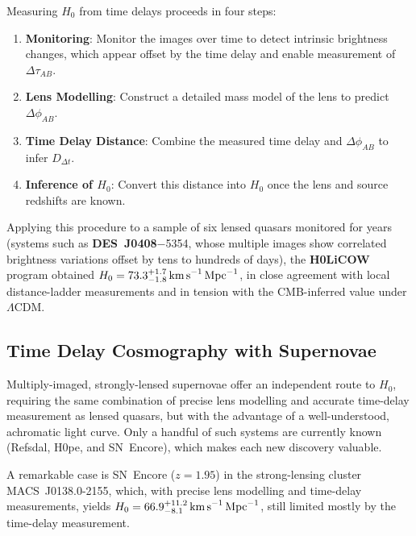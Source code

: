 \medskip

Measuring $H_0$ from time delays proceeds in four steps:
\begin{enumerate}
    \item \textbf{Monitoring}: Monitor the images over time to detect intrinsic brightness changes, which appear offset by the time delay and enable measurement of $\Delta\tau_{AB}$.
    \item \textbf{Lens Modelling}: Construct a detailed mass model of the lens to predict $\Delta\phi_{AB}$.
    \item \textbf{Time Delay Distance}: Combine the measured time delay and $\Delta\phi_{AB}$ to infer  $D_{\Delta t}$.
    \item \textbf{Inference of $H_0$}: Convert this distance into $H_0$ once the lens and source redshifts are known.
\end{enumerate}

\begin{observationblock}
Applying this procedure to a sample of six lensed quasars monitored for years (systems such as \textbf{DES~J0408}$-$5354, whose multiple images show correlated brightness variations offset by tens to hundreds of days), the \textbf{H0LiCOW} program obtained $H_0 = 73.3^{+1.7}_{-1.8}\,\text{km\,s}^{-1}\,\text{Mpc}^{-1}$, in close agreement with local distance-ladder measurements and in tension with the CMB-inferred value under $\Lambda$CDM.
\end{observationblock}

\subsection{Time Delay Cosmography with Supernovae} \label{subsec:sn_time_delay}

Multiply-imaged, strongly-lensed supernovae offer an independent route to $H_0$, requiring the same combination of precise lens modelling and accurate time-delay measurement as lensed quasars, but with the advantage of a well-understood, achromatic light curve. Only a handful of such systems are currently known (Refsdal, H0pe, and SN~Encore), which makes each new discovery valuable. 

A remarkable case is SN~Encore ($z=1.95$) in the strong-lensing cluster MACS~J0138.0-2155, which, with precise lens modelling and time-delay measurements, yields $H_0 = 66.9^{+11.2}_{-8.1}\,\text{km\,s}^{-1}\,\text{Mpc}^{-1}$, still limited mostly by the time-delay measurement.


